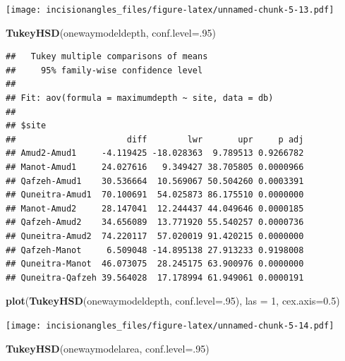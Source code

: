 \documentclass[
]{article}
\newenvironment{Shaded}{\begin{snugshade}}{\end{snugshade}}
\newcommand{\AttributeTok}[1]{\textcolor[rgb]{0.13,0.29,0.53}{#1}}
\newcommand{\DecValTok}[1]{\textcolor[rgb]{0.00,0.00,0.81}{#1}}
\newcommand{\FloatTok}[1]{\textcolor[rgb]{0.00,0.00,0.81}{#1}}
\newcommand{\FunctionTok}[1]{\textcolor[rgb]{0.13,0.29,0.53}{\textbf{#1}}}
\newcommand{\NormalTok}[1]{#1}
\begin{document}
\texttt{[image: incisionangles\_files/figure-latex/unnamed-chunk-5-13.pdf]}

\begin{Shaded}
\begin{Highlighting}[]
\FunctionTok{TukeyHSD}\NormalTok{(onewaymodeldepth, }\AttributeTok{conf.level=}\NormalTok{.}\DecValTok{95}\NormalTok{) }
\end{Highlighting}
\end{Shaded}

\begin{verbatim}
##   Tukey multiple comparisons of means
##     95% family-wise confidence level
## 
## Fit: aov(formula = maximumdepth ~ site, data = db)
## 
## $site
##                      diff        lwr       upr     p adj
## Amud2-Amud1     -4.119425 -18.028363  9.789513 0.9266782
## Manot-Amud1     24.027616   9.349427 38.705805 0.0000966
## Qafzeh-Amud1    30.536664  10.569067 50.504260 0.0003391
## Quneitra-Amud1  70.100691  54.025873 86.175510 0.0000000
## Manot-Amud2     28.147041  12.244437 44.049646 0.0000185
## Qafzeh-Amud2    34.656089  13.771920 55.540257 0.0000736
## Quneitra-Amud2  74.220117  57.020019 91.420215 0.0000000
## Qafzeh-Manot     6.509048 -14.895138 27.913233 0.9198008
## Quneitra-Manot  46.073075  28.245175 63.900976 0.0000000
## Quneitra-Qafzeh 39.564028  17.178994 61.949061 0.0000191
\end{verbatim}

\begin{Shaded}
\begin{Highlighting}[]
\FunctionTok{plot}\NormalTok{(}\FunctionTok{TukeyHSD}\NormalTok{(onewaymodeldepth, }\AttributeTok{conf.level=}\NormalTok{.}\DecValTok{95}\NormalTok{), }\AttributeTok{las =} \DecValTok{1}\NormalTok{, }\AttributeTok{cex.axis=}\FloatTok{0.5}\NormalTok{)}
\end{Highlighting}
\end{Shaded}

\texttt{[image: incisionangles\_files/figure-latex/unnamed-chunk-5-14.pdf]}

\begin{Shaded}
\begin{Highlighting}[]
\FunctionTok{TukeyHSD}\NormalTok{(onewaymodelarea, }\AttributeTok{conf.level=}\NormalTok{.}\DecValTok{95}\NormalTok{) }
\end{Highlighting}
\end{Shaded}
\end{document}

